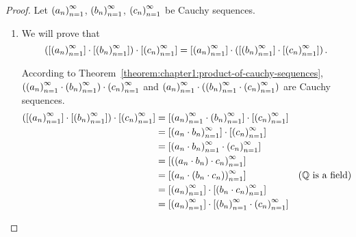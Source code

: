 \begin{proof}
    Let ${\left({a_{n}}\right)}^{\infty}_{n=1}$, ${\left({b_{n}}\right)}^{\infty}_{n=1}$, ${\left({c_{n}}\right)}^{\infty}_{n=1}$ be Cauchy sequences.
    \begin{enumerate}[label={(F\arabic*)},itemsep=0pt,start=5]
        \item We will prove that
              \[
                  \left(\left[{{\left({a_{n}}\right)}^{\infty}_{n=1}}\right]\cdot\left[{{\left({b_{n}}\right)}^{\infty}_{n=1}}\right]\right)\cdot\left[{{\left({c_{n}}\right)}^{\infty}_{n=1}}\right] = \left[{{\left({a_{n}}\right)}^{\infty}_{n=1}}\right]\cdot\left(\left[{{\left({b_{n}}\right)}^{\infty}_{n=1}}\right]\cdot\left[{{\left({c_{n}}\right)}^{\infty}_{n=1}}\right]\right).
              \]

              According to Theorem~\ref{theorem:chapter1:product-of-cauchy-sequences}, $\left({\left({a_{n}}\right)}^{\infty}_{n=1}\cdot{\left({b_{n}}\right)}^{\infty}_{n=1}\right)\cdot{\left({c_{n}}\right)}^{\infty}_{n=1}$ and ${\left({a_{n}}\right)}^{\infty}_{n=1}\cdot\left({\left({b_{n}}\right)}^{\infty}_{n=1}\cdot{\left({c_{n}}\right)}^{\infty}_{n=1}\right)$ are Cauchy sequences.
              \begin{align*}
                  \left(\class{\seq{a_{n}}}\cdot\class{\seq{b_{n}}}\right)\cdot\class{\seq{c_{n}}} & = \class{\seq{a_{n}}\cdot\seq{b_{n}}}\cdot\class{\seq{c_{n}}}                                                          \\
                                                                                                   & = \class{\seq{a_{n}\cdot b_{n}}}\cdot\class{\seq{c_{n}}}                                                               \\
                                                                                                   & = \class{\seq{a_{n}\cdot b_{n}}\cdot\seq{c_{n}}}                                                                       \\
                                                                                                   & = \class{\seq{(a_{n}\cdot b_{n})\cdot c_{n}}}                                                                          \\
                                                                                                   & = \class{\seq{a_{n}\cdot(b_{n}\cdot c_{n})}}                                        & \text{($\mathbb{Q}$ is a field)} \\
                                                                                                   & = \class{\seq{a_{n}}}\cdot\class{\seq{b_{n}\cdot c_{n}}}                                                               \\
                                                                                                   & = \class{\seq{a_{n}}}\cdot\class{\seq{b_{n}}\cdot\seq{c_{n}}}                                                          \\

\end{align*}
\end{enumerate}
\end{proof}
